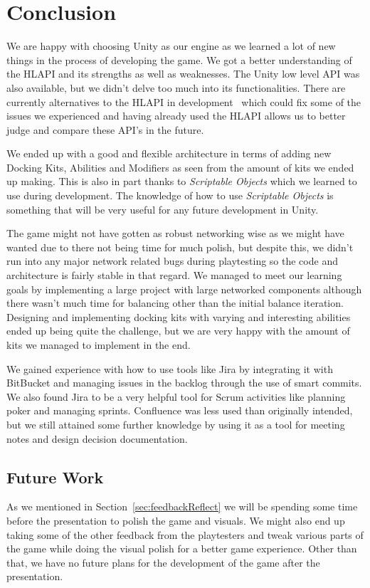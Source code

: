\chapter{Conclusion}
\label{chap:conclusion}

We are happy with choosing Unity as our engine as we learned a lot of new things in the process of developing the game. We got a better understanding of the HLAPI and its strengths as well as weaknesses. The Unity low level API was also available, but we didn't delve too much into its functionalities. There are currently alternatives to the HLAPI in development~\cite{photonThunder} which could fix some of the issues we experienced and having already used the HLAPI allows us to better judge and compare these API's in the future.

We ended up with a good and flexible architecture in terms of adding new Docking Kits, Abilities and Modifiers as seen from the amount of kits we ended up making. This is also in part thanks to \emph{Scriptable Objects} which we learned to use during development. The knowledge of how to use \emph{Scriptable Objects} is something that will be very useful for any future development in Unity. 

The game might not have gotten as robust networking wise as we might have wanted due to there not being time for much polish, but despite this, we didn't run into any major network related bugs during playtesting so the code and architecture is fairly stable in that regard. We managed to meet our learning goals by implementing a large project with large networked components although there wasn't much time for balancing other than the initial balance iteration. Designing and implementing docking kits with varying and interesting abilities ended up being quite the challenge, but we are very happy with the amount of kits we managed to implement in the end. 

We gained experience with how to use tools like Jira by integrating it with BitBucket and managing issues in the backlog through the use of smart commits. We also found Jira to be a very helpful tool for Scrum activities like planning poker and managing sprints. Confluence was less used than originally intended, but we still attained some further knowledge by using it as a tool for meeting notes and design decision documentation. 

\section{Future Work}
\label{sec:future}
As we mentioned in Section~\ref{sec:feedbackReflect} we will be spending some time before the presentation to polish the game and visuals. We might also end up taking some of the other feedback from the playtesters and tweak various parts of the game while doing the visual polish for a better game experience. Other than that, we have no future plans for the development of the game after the presentation.  
